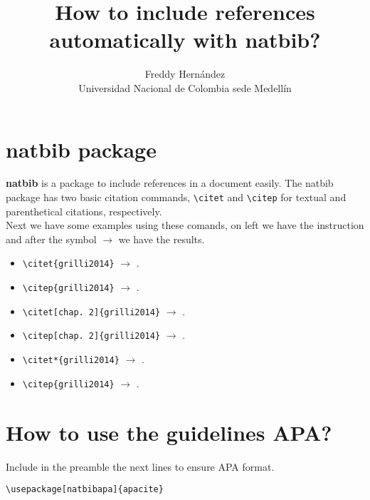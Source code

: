 \documentclass[10pt]{article}
\begin{document}
	
	\title{How to include references automatically with \textbf{natbib}?}
	\author{Freddy Hern\'andez \\ Universidad Nacional de Colombia sede Medell\'in}
	\maketitle
\section{\textbf{natbib} package}
\textbf{natbib} is a package to include references in a document easily. The natbib package has two basic citation commands, \verb|\citet| and \verb|\citep| for textual and parenthetical citations, respectively.\\

Next we have some examples using these comands, on left we have the instruction and after the symbol $\longrightarrow$ we have the results.

\begin{itemize}
	\item \verb|\citet{grilli2014}| $\longrightarrow$ \citet{grilli2014}. \\
	\item \verb|\citep{grilli2014}| $\longrightarrow$ \citep{grilli2014}. \\
	\item \verb|\citet[chap. 2]{grilli2014}| $\longrightarrow$ \citet[chap. 2]{grilli2014}. \\
	\item \verb|\citep[chap. 2]{grilli2014}| $\longrightarrow$ \citep[chap. 2]{grilli2014}. \\
	\item \verb|\citet*{grilli2014}| $\longrightarrow$ \citet{grilli2014}. \\
	\item \verb|\citep{grilli2014}| $\longrightarrow$ \citep{grilli2014}. \\
\end{itemize}

\section{How to use the guidelines APA?}
Include in the preamble the next lines to ensure APA format.

\begin{verbatim}
\usepackage[natbibapa]{apacite}

\end{verbatim}
\end{document}
